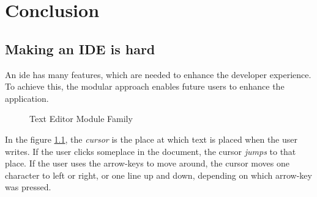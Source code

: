 \chapter{Conclusion} \label{cha:conclusion}


\section{Making an IDE is hard}

An \gls{ide} has many features, which are needed to enhance the developer
experience. To achieve this, the modular approach enables future users to
enhance the application.

\begin{figure}
  \centering
  
  \caption{Text Editor Module Family}
  \label{fig:extendedModuleFamily}
\end{figure}

In the figure \ref{fig:extendedModuleFamily}, the \textit{cursor} is the place
at which text is placed when the user writes. If the user clicks someplace in
the document, the cursor \textit{jumps} to that place. If the user uses the
arrow-keys to move around, the cursor moves one character to left or right, or
one line up and down, depending on which arrow-key was pressed.
